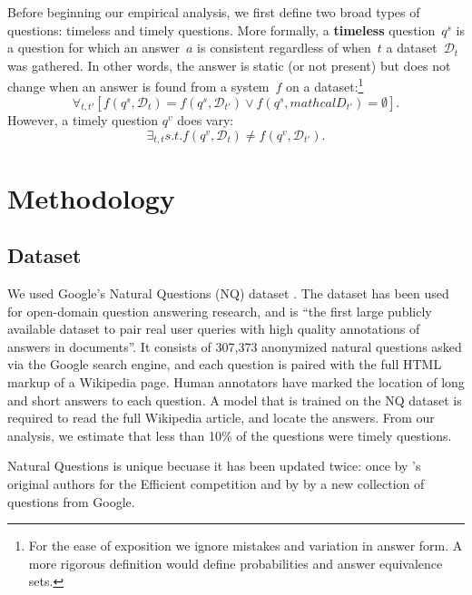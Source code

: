\documentclass{article}
\begin{document}
Before beginning our empirical analysis, we first define two broad
types of questions: timeless and timely questions.
%
More formally, a {\bf timeless} question~$q^{s}$ is a question for
which an answer~$a$ is consistent regardless of when~$t$ a
dataset~$\mathcal{D}_t$ was gathered.
%
In other words, the answer is static (or not present) but does not
change when an answer is found from a  system~$f$ on a
dataset:\footnote{For the ease of exposition we ignore 
mistakes and variation in answer form.  A more rigorous definition
would define probabilities and answer equivalence sets.}
%
\begin{equation}
  \forall_{t,t'} \left[ f(q^{s}, \mathcal{D}_t) = f(q^{s},
    \mathcal{D}_{t'}) \vee f(q^{s}, mathcal{D}_{t'}) = \emptyset
    \right].
\end{equation}
%
However, a timely question $q^{v}$ does vary:
%
\begin{equation}
  \exists_{t,t} s.t. f(q^{v}, \mathcal{D}_t) \not = f(q^{v},
  \mathcal{D}_{t'}).
\end{equation}

\section{Methodology}
\label{methodology}


\subsection{Dataset}
\label{dataset}


We used Google’s Natural Questions (NQ) dataset \cite{nqdataset}. The
dataset has been used for open-domain question answering research, and
is “the first large publicly available dataset to pair real user
queries with high quality annotations of answers in documents”. It
consists of 307,373 anonymized natural questions asked via the Google
search engine, and each question is paired with the full HTML markup
of a Wikipedia page. Human annotators have marked the location of long
and short answers to each question. A model that is trained on the NQ
dataset is required to read the full Wikipedia article, and locate the
answers. From our analysis, we estimate that less than 10\% of the
questions were timely questions.

Natural Questions is unique becuase it has been updated twice: once by
's original authors for the Efficient  competition and
by  by a new collection of questions from Google.
\end{document}
